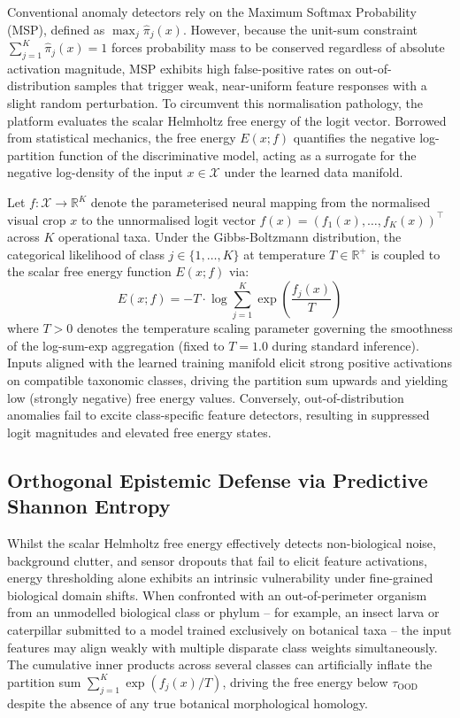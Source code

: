 Conventional anomaly detectors rely on the Maximum Softmax Probability (MSP), defined as $\max_j \hat{\pi}_j(x)$. However, because the unit-sum constraint $\sum_{j=1}^K \hat{\pi}_j(x) = 1$ forces probability mass to be conserved regardless of absolute activation magnitude, MSP exhibits high false-positive rates on out-of-distribution samples that trigger weak, near-uniform feature responses with a slight random perturbation. To circumvent this normalisation pathology, the platform evaluates the scalar Helmholtz free energy of the logit vector. Borrowed from statistical mechanics, the free energy $E(x; f)$ quantifies the negative log-partition function of the discriminative model, acting as a surrogate for the negative log-density of the input $x \in \mathcal{X}$ under the learned data manifold.

Let $f: \mathcal{X} \to \mathbb{R}^K$ denote the parameterised neural mapping from the normalised visual crop $x$ to the unnormalised logit vector $f(x) = (f_1(x), \dots, f_K(x))^\top$ across $K$ operational taxa. Under the Gibbs-Boltzmann distribution, the categorical likelihood of class $j \in \{1, \dots, K\}$ at temperature $T \in \mathbb{R}^+$ is coupled to the scalar free energy function $E(x; f)$ via:
\begin{equation}
E(x; f) = -T \cdot \log \sum_{j=1}^{K} \exp\left(\frac{f_j(x)}{T}\right)
\label{eq:helmholtz_energy}
\end{equation}
where $T > 0$ denotes the temperature scaling parameter governing the smoothness of the log-sum-exp aggregation (fixed to $T = 1.0$ during standard inference). Inputs aligned with the learned training manifold elicit strong positive activations on compatible taxonomic classes, driving the partition sum upwards and yielding low (strongly negative) free energy values. Conversely, out-of-distribution anomalies fail to excite class-specific feature detectors, resulting in suppressed logit magnitudes and elevated free energy states.

\subsection{Orthogonal Epistemic Defense via Predictive Shannon Entropy}
\label{subsec:predictive_entropy}

Whilst the scalar Helmholtz free energy effectively detects non-biological noise, background clutter, and sensor dropouts that fail to elicit feature activations, energy thresholding alone exhibits an intrinsic vulnerability under fine-grained biological domain shifts. When confronted with an out-of-perimeter organism from an unmodelled biological class or phylum -- for example, an insect larva or caterpillar submitted to a model trained exclusively on botanical taxa -- the input features may align weakly with multiple disparate class weights simultaneously. The cumulative inner products across several classes can artificially inflate the partition sum $\sum_{j=1}^K \exp(f_j(x)/T)$, driving the free energy below $\tau_{\text{OOD}}$ despite the absence of any true botanical morphological homology.

